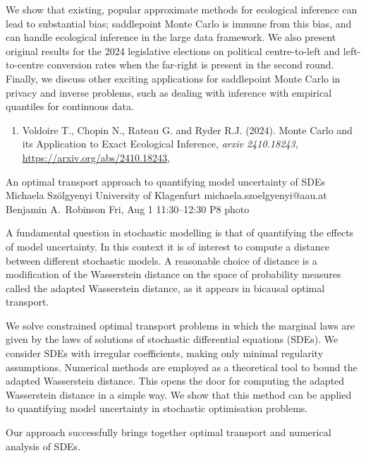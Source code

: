 \begin{talk}
We show that existing, popular approximate methods for ecological inference can
lead to substantial bias; saddlepoint Monte Carlo is immune from this bias, and 
can handle ecological inference in the large data framework. We also
present original results for the 2024 legislative elections on political
centre-to-left and left-to-centre conversion rates when the far-right is
present in the second round. Finally, we discuss other exciting applications
for saddlepoint Monte Carlo in privacy and inverse problems, such as dealing
with inference with empirical quantiles for continuous data.

\medskip

\begin{enumerate}
 \item[{[1]}] 
      Voldoire T., Chopin N., Rateau G. and Ryder R.J. (2024).
      Monte Carlo and its Application to Exact Ecological Inference, 
      \textit{arxiv 2410.18243},
      \url{https://arxiv.org/abs/2410.18243}, 
\end{enumerate}
\vspace{-10ex}
\end{talk}

\clearpage
\begin{talk}
  {An optimal transport approach to quantifying model uncertainty of SDEs}%
  {Michaela Sz\"olgyenyi}%
  {University of Klagenfurt}%
  {michaela.szoelgyenyi@aau.at}%
  {Benjamin A.~Robinson}%
  {}%
  {Fri, Aug 1 11:30--12:30}%
  {P8}%
  {photo}%
  
    
   
A fundamental question in stochastic modelling is that of quantifying the effects of model uncertainty. In this context it is of interest to compute a distance between different stochastic models. A  reasonable choice of distance is a modification of the Wasserstein distance on the space of probability measures called the adapted Wasserstein distance, as it appears in bicausal optimal transport.

 We solve constrained optimal transport problems in which the marginal laws are given by the laws of solutions of stochastic differential equations (SDEs). We consider SDEs with irregular coefficients, making only minimal regularity assumptions. Numerical methods are employed as a theoretical tool to bound the adapted Wasserstein distance. This opens the door for computing the adapted Wasserstein distance in a simple way. We show that this method can be applied to quantifying model uncertainty in stochastic optimisation problems.  
 
 Our approach successfully brings together optimal transport and numerical analysis of SDEs. 
\end{talk}

